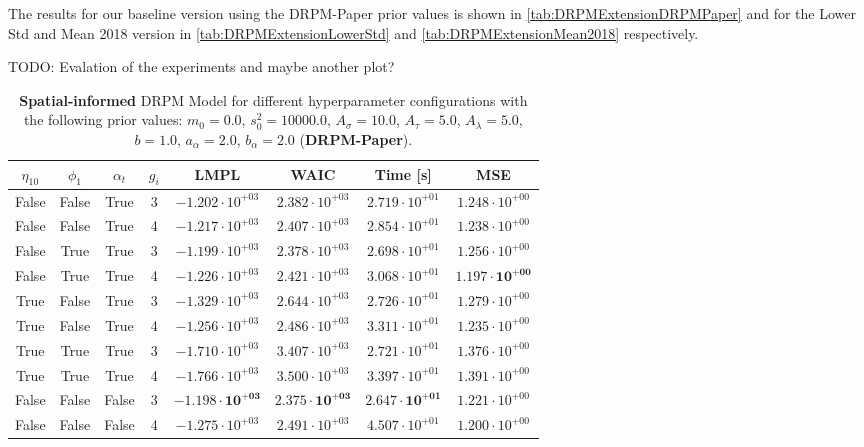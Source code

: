 \documentclass[12pt,a4paper]{article}
\begin{document}
The results for our baseline version using the DRPM-Paper prior values is shown in \cref{tab:DRPMExtensionDRPMPaper} and
for the Lower Std and Mean 2018 version in \cref{tab:DRPMExtensionLowerStd} and \cref{tab:DRPMExtensionMean2018} respectively.

TODO: Evalation of the experiments and maybe another plot?

\begin{table}
\caption{\textbf{Spatial-informed} DRPM Model for different hyperparameter configurations with the following prior values: $m_0 = 0.0$, $s_0^2 = 10000.0$, $A_\sigma = 10.0$, $A_\tau = 5.0$, $A_\lambda = 5.0$, $b = 1.0$, $a_\alpha = 2.0$, $b_\alpha = 2.0$ (\textbf{DRPM-Paper}).}
\centering\begin{tabular}{cccccccc}
\toprule
$\eta_{10}$ & $\phi_1$ & $\alpha_t$ & $g_i$ & LMPL & WAIC & Time [s] & MSE \\
\midrule
False & False & True & 3 & $-1.202 \cdot 10^{+03}$ & $2.382 \cdot 10^{+03}$ & $2.719 \cdot 10^{+01}$ & $1.248 \cdot 10^{+00}$ \\
False & False & True & 4 & $-1.217 \cdot 10^{+03}$ & $2.407 \cdot 10^{+03}$ & $2.854 \cdot 10^{+01}$ & $1.238 \cdot 10^{+00}$  \\
False & True & True & 3 & $-1.199 \cdot 10^{+03}$ & $2.378 \cdot 10^{+03}$ & $2.698 \cdot 10^{+01}$ & $1.256 \cdot 10^{+00}$  \\
False & True & True & 4 & $-1.226 \cdot 10^{+03}$ & $2.421 \cdot 10^{+03}$ & $3.068 \cdot 10^{+01}$ & $\mathbf{1.197 \cdot 10^{+00}}$  \\
True & False & True & 3 & $-1.329 \cdot 10^{+03}$ & $2.644 \cdot 10^{+03}$ & $2.726 \cdot 10^{+01}$ & $1.279 \cdot 10^{+00}$  \\
True & False & True & 4 & $-1.256 \cdot 10^{+03}$ & $2.486 \cdot 10^{+03}$ & $3.311 \cdot 10^{+01}$ & $1.235 \cdot 10^{+00}$  \\
True & True & True & 3 & $-1.710 \cdot 10^{+03}$ & $3.407 \cdot 10^{+03}$ & $2.721 \cdot 10^{+01}$ & $1.376 \cdot 10^{+00}$ \\
True & True & True & 4 & $-1.766 \cdot 10^{+03}$ & $3.500 \cdot 10^{+03}$ & $3.397 \cdot 10^{+01}$ & $1.391 \cdot 10^{+00}$ \\
False & False & False & 3 & $\mathbf{-1.198 \cdot 10^{+03}}$ & $\mathbf{2.375 \cdot 10^{+03}}$ & $\mathbf{2.647 \cdot 10^{+01}}$ & $1.221 \cdot 10^{+00}$  \\
False & False & False & 4 & $-1.275 \cdot 10^{+03}$ & $2.491 \cdot 10^{+03}$ & $4.507 \cdot 10^{+01}$ & $1.200 \cdot 10^{+00}$  \\

\end{tabular}
\end{table}
\end{document}
